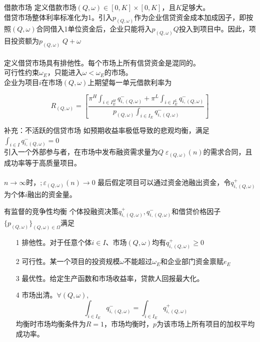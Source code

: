 \documentclass{beamer}
\begin{document}
\begin{frame}{借款市场}
	定义借款市场$(Q,\omega)\in \left[0,K\right]\times\left[0,K\right]$，且$K$足够大。\\
	借贷市场整体利率标准化为1。引入$p_{(Q,\omega)}$作为企业信贷资金成本加成因子，即按照$(Q,\omega)$合同借入1单位资金后，企业只能将入$p_{(Q,\omega)}Q$投入到项目中。因此，项目投资额为$p_{\left(Q,\omega \right)}\;Q+\omega$\\~\\
	定义借贷市场具有排他性。每个市场上所有信贷资金是混同的。\\
	可行性约束$\omega_E$，只能进入$\omega<\omega_{E}$的市场。\\
	企业为项目$i$在市场$\left(Q,\omega\right)$上期望每一单元借款利率为
	
	$$ R_{(Q,\omega)}=\left[\frac{\pi^H\int_{i\in I_{E}^{H}}q_{i,(Q,\omega)}^{-}+\pi^L\int_{i\in I_{E}^{L}}q_{i,(Q,\omega)}^{-}}{p_{\left(Q,\omega\right)}\int_{i\in I_{E}}q_{i,\left(Q,\omega\right)}^{-}} \right]$$

\end{frame}

\begin{frame}{补充：不活跃的信贷市场}
	如预期收益率极低导致的悲观均衡，满足$\int_{i\in I}q_{i,\left(Q,\omega\right)}^{-}=0$\\
	引入一个外部参与者，在市场中发布融资需求量为$Q\;\varepsilon_{\left(Q,\omega\right)}\left(n\right)$的需求合同，且成功率等于高质量项目。\\~\\
	$n\to\infty$时，$;\varepsilon_{\left(Q,\omega\right)}\left(n\right)\to 0$
	最后假定项目可以通过资金池融出资金，令$ q_{i,\left(Q,\omega\right)}^{+} $为个体$ i $融出的资金量。
\end{frame}

\begin{frame}{有监督的竞争性均衡}
	个体投融资决策${q_{i,\left(Q,\omega\right)}^{+},q_{i,\left(Q,\omega\right)}^{-}}$和借贷价格因子$\{ p_{(Q,\omega)}\}_{(Q,\omega)\in\Omega}$满足
	\begin{itemize}
		\item[1] 排他性。对于任意个体$i\in I$、市场$\left(Q,\omega\right)$均有$q_{i,\left(Q,\omega\right)}^{+}\geq0$
		\item[2] 可行性。某一个项目的投资规模$\omega$不能超过$\omega_E$和企业部门资金禀赋$e_E$
		\item[3] 最优性。给定生产函数和市场收益率，贷款人回报最大化。
		\item[4] 市场出清。$\forall \left(Q,\omega\right)$,
		$$\int_{i\in I_{E}}q_{i,(Q,\omega)}^{-}=\int_{i\in I_{E}}q_{i,(Q,\omega)}^{+}$$
		均衡时市场均衡条件为$R=1$，市场均衡时，$p$为该市场上所有项目的加权平均成功率。
	\end{itemize}
\end{frame}
\end{document}
